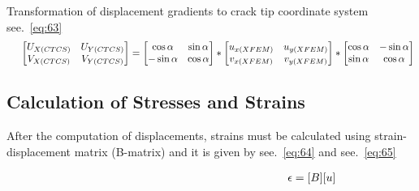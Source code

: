 \documentclass[fleqn, 12.5pt,a4paper]{report}
\begin{document}
Transformation of displacement gradients to crack tip coordinate system  see.~\autoref{eq:63}
\begin{align}\label{eq:63}
\hspace{0.5cm}\begin{bmatrix}
U_{X (CTCS)} & U_{Y (CTCS)}\\
V_{X (CTCS)} & V_{Y (CTCS)}\\
\end{bmatrix}
=
\begin{bmatrix}
\cos\alpha & \sin\alpha\\
-\sin\alpha & \cos\alpha\\
\end{bmatrix}
*
\begin{bmatrix}
u_{x (XFEM)} & u_{y (XFEM)}\\
v_{x (XFEM)} & v_{y (XFEM)}\\
\end{bmatrix}
*
\begin{bmatrix}
\cos\alpha & -\sin\alpha\\
\sin\alpha & \cos\alpha\\
\end{bmatrix}
\end{align}

\subsection{Calculation of Stresses and Strains}
After the computation of displacements, strains must be calculated using strain-displacement matrix (B-matrix) and it is given by see.~\autoref{eq:64} and see.~\autoref{eq:65}

\begin{align}\label{eq:64}
\hspace{6.25cm}\epsilon = [B][u]
\end{align}
\end{document}
